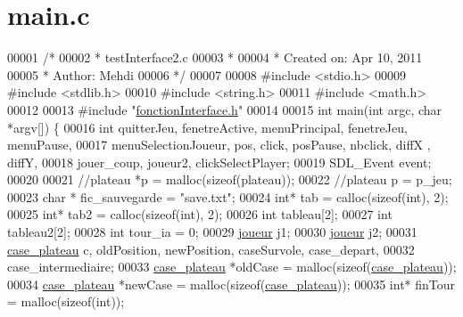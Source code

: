\hypertarget{main_8c_source}{
\section{main.c}
}

\begin{DoxyCode}
00001 \textcolor{comment}{/*}
00002 \textcolor{comment}{ * testInterface2.c}
00003 \textcolor{comment}{ *}
00004 \textcolor{comment}{ *  Created on: Apr 10, 2011}
00005 \textcolor{comment}{ *      Author: Mehdi}
00006 \textcolor{comment}{ */}
00007 
00008 \textcolor{preprocessor}{#include <stdio.h>}
00009 \textcolor{preprocessor}{#include <stdlib.h>}
00010 \textcolor{preprocessor}{#include <string.h>}
00011 \textcolor{preprocessor}{#include <math.h>}
00012 
00013 \textcolor{preprocessor}{#include "\hyperlink{fonction_interface_8h}{fonctionInterface.h}"}
00014 
00015 \textcolor{keywordtype}{int} main(\textcolor{keywordtype}{int} argc, \textcolor{keywordtype}{char} *argv[]) \{
00016         \textcolor{keywordtype}{int} quitterJeu, fenetreActive, menuPrincipal, fenetreJeu, menuPause,
00017                         menuSelectionJoueur, pos, click, posPause, nbclick, diffX
      , diffY,
00018                         jouer\_coup, joueur2, clickSelectPlayer;
00019         SDL\_Event event;
00020 
00021         \textcolor{comment}{//plateau *p = malloc(sizeof(plateau));}
00022         \textcolor{comment}{//plateau p = p\_jeu;}
00023         \textcolor{keywordtype}{char} * fic\_sauvegarde = \textcolor{stringliteral}{"save.txt"};
00024         \textcolor{keywordtype}{int}* tab = calloc(\textcolor{keyword}{sizeof}(\textcolor{keywordtype}{int}), 2);
00025         \textcolor{keywordtype}{int}* tab2 = calloc(\textcolor{keyword}{sizeof}(\textcolor{keywordtype}{int}), 2);
00026         \textcolor{keywordtype}{int} tableau[2];
00027         \textcolor{keywordtype}{int} tableau2[2];
00028         \textcolor{keywordtype}{int} tour\_ia = 0;
00029         \hyperlink{structjoueur}{joueur} j1;
00030         \hyperlink{structjoueur}{joueur} j2;
00031         \hyperlink{structcase__plateau}{case_plateau} c, oldPosition, newPosition, caseSurvole, case\_depart,
00032                         case\_intermediaire;
00033         \hyperlink{structcase__plateau}{case_plateau} *oldCase = malloc(\textcolor{keyword}{sizeof}(\hyperlink{structcase__plateau}{case_plateau}));
00034         \hyperlink{structcase__plateau}{case_plateau} *newCase = malloc(\textcolor{keyword}{sizeof}(\hyperlink{structcase__plateau}{case_plateau}));
00035         \textcolor{keywordtype}{int}* finTour = malloc(\textcolor{keyword}{sizeof}(\textcolor{keywordtype}{int}));

\end{DoxyCode}
